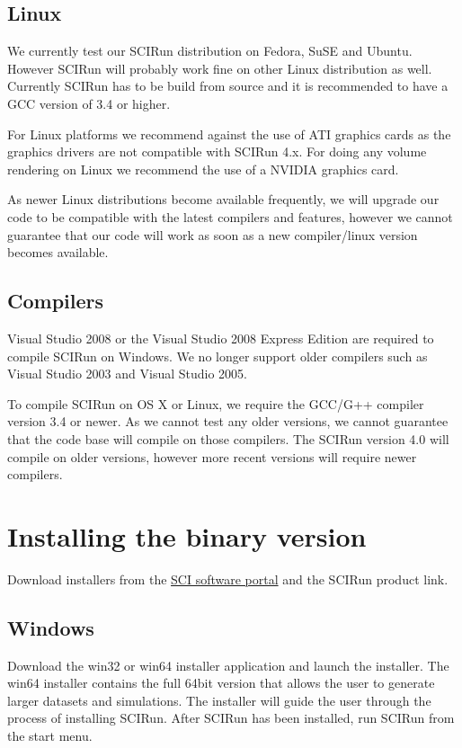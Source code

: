 \documentclass[fleqn,12pt,openany]{book}
\begin{document}
\subsection{Linux}

We currently test our SCIRun distribution on Fedora, SuSE and Ubuntu.
However SCIRun will probably work fine on other Linux distribution as well.
Currently SCIRun has to be build from source and it is recommended to have a GCC version of 3.4 or higher.

For Linux platforms we recommend against the use of ATI graphics cards as the graphics drivers are not compatible with SCIRun 4.x.
For doing any volume rendering on Linux we recommend the use of a NVIDIA graphics card.

As newer Linux distributions become available frequently, we will upgrade our code to be compatible with the latest
compilers and features, however we cannot guarantee that our code will work as soon as a new compiler/linux version
becomes available. 

\subsection{Compilers}

Visual Studio 2008 or the Visual Studio 2008 Express Edition are required to compile SCIRun on Windows.
We no longer support older compilers such as Visual Studio 2003 and Visual Studio 2005.

To compile SCIRun on OS X or Linux, we require the GCC/G++ compiler version 3.4 or newer.
As we cannot test any older versions, we cannot guarantee that the code base will compile on those compilers.
The SCIRun version 4.0 will compile on older versions, however more recent versions will require newer compilers.

\section{Installing the binary version}

Download installers from the
\href{http://software.sci.utah.edu}{SCI software portal}
and the SCIRun product link.

\subsection{Windows}

Download the win32 or win64 installer application and launch the installer.
The win64 installer contains the full 64bit version that allows the user to generate larger datasets and simulations.
The installer will guide the user through the process of installing SCIRun.
After SCIRun has been installed, run SCIRun from the start menu. 
\end{document}
